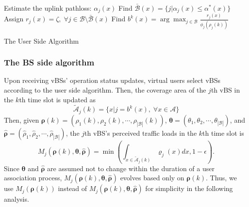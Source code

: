 \documentclass[journal]{IEEEtran}
\theoremstyle{definition}
\begin{document}
\begin{algorithm}
\nl Estimate the uplink pathloss: $\alpha_{j}(x)$\;
\nl Find $\bar{\mathcal{B}}(x)=\{j|\alpha_{j}(x)\leq\alpha^{*}(x)\}$\;
\nl Assign $r_{j}(x)=\zeta, \;\forall j\in\mathcal{B}\setminus\bar{\mathcal{B}}(x)$\;
\nl Find $b^{k}(x)= \arg\max_{j \in \mathcal{B}}\frac{r_{j}(x)}{\phi_{j}(\rho_{j}(k))}$\;
\caption{The User Side Algorithm\label{alg:usa_alg}}
\end{algorithm}


\subsubsection{The BS side algorithm}
Upon receiving vBSs' operation status updates, virtual users select vBSs according to the user side algorithm. Then, the coverage area of the $j$th vBS in the $k$th time slot is updated as
\begin{equation}
\label{eq:bs_cover_area}
\mathcal{\tilde{A}}_{j}(k)=\{x |j=b^{k}(x),\;\forall x \in \mathcal{A}\}
\end{equation}
Then, given $\boldsymbol{\rho}(k)=(\rho_{1}(k),\rho_{2}(k),\cdots,\rho_{|\mathcal{B}|}(k))$, $\boldsymbol{\theta}=({\theta_{1},\theta_{2},\cdots,\theta_{|\mathcal{B}|}})$, and $\boldsymbol{\hat{\rho}}=(\hat{\rho}_{1},\hat{\rho}_{2},\cdots,\hat{\rho}_{|\mathcal{B}|})$, the $j$th vBS's perceived traffic loads in the $k$th time slot is
\begin{equation}
\label{eq:update_traffic}
M_{j}(\boldsymbol{\rho}(k),\boldsymbol{\theta},\boldsymbol{\hat{\rho}})=\min{(\int_{x \in \mathcal{\tilde{A}}_{j}(k)}\varrho_{j}(x)dx,1-\epsilon)}.
\end{equation}
Since $\boldsymbol{\theta}$ and $\boldsymbol{\hat{\rho}}$ are assumed not to change within the duration of a user association process, $M_{j}(\boldsymbol{\rho}(k),\boldsymbol{\theta},\boldsymbol{\hat{\rho}})$ evolves based only on $\boldsymbol{\rho}(k)$. Thus, we use $M_{j}(\boldsymbol{\rho}(k))$ instead of $M_{j}(\boldsymbol{\rho}(k),\boldsymbol{\theta},\boldsymbol{\hat{\rho}})$ for simplicity in the following analysis.
\end{document}
